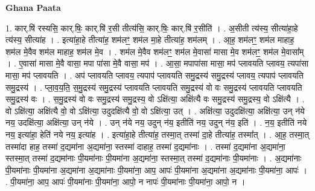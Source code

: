 \documentclass[17pt]{extarticle}
\begin{document}
\textbf{Ghana Paata } \newline

1. कार्.षि॑ रस्यसि॒ कार्.षिः॒ कार्.षि॑ र॒सी तीत्य॑सि॒ कार्.षिः॒ कार्.षि॑ र॒सीति॑ । . अ॒सीती त्य॑स्य॒ सीत्या॑हा॒हे त्य॑स्य॒ सीत्या॑ह । . इत्या॑हा॒हे तीत्या॑ह॒ शम॑लꣳ॒॒ शम॑ल मा॒हे तीत्या॑ह॒ शम॑लम् । . आ॒ह॒ शम॑लꣳ॒॒ शम॑ल माहाह॒ शम॑ल मे॒वैव शम॑ल माहाह॒ शम॑ल मे॒व । . शम॑ल मे॒वैव शम॑लꣳ॒॒ शम॑ल मे॒वासा॑ मासा मे॒व शम॑लꣳ॒॒ शम॑ल मे॒वासा᳚म् । . ए॒वासा॑ मासा मे॒वै वासा॒ मपा पा॑सा मे॒वै वासा॒ मप॑ । . आ॒सा॒ मपापा॑सा मासा॒ मप॑ प्लावयति प्लावय॒ त्यपा॑सा मासा॒ मप॑ प्लावयति । . अप॑ प्लावयति प्लावय॒ त्यपाप॑ प्लावयति समु॒द्रस्य॑ समु॒द्रस्य॑ प्लावय॒ त्यपाप॑ प्लावयति समु॒द्रस्य॑ । . प्ला॒व॒य॒ति॒ स॒मु॒द्रस्य॑ समु॒द्रस्य॑ प्लावयति प्लावयति समु॒द्रस्य॑ वो वः समु॒द्रस्य॑ प्लावयति प्लावयति समु॒द्रस्य॑ वः । . स॒मु॒द्रस्य॑ वो वः समु॒द्रस्य॑ समु॒द्रस्य॒ वो ऽक्षि॑त्या॒ अक्षि॑त्यै वः समु॒द्रस्य॑ समु॒द्रस्य॒ वो ऽक्षि॑त्यै । . वो ऽक्षि॑त्या॒ अक्षि॑त्यै वो॒ वो ऽक्षि॑त्या॒ उदुदक्षि॑त्यै वो॒ वो ऽक्षि॑त्या॒ उत् । . अक्षि॑त्या॒ उदुदक्षि॑त्या॒ अक्षि॑त्या॒ उन् न॑ये नय॒ उदक्षि॑त्या॒ अक्षि॑त्या॒ उन् न॑ये । . उन् न॑ये नय॒ उदुन् न॑य॒ इतीति॑ नय॒ उदुन् न॑य॒ इति॑ । . न॒य॒ इतीति॑ नये नय॒ इत्या॑हा॒ हेति॑ नये नय॒ इत्या॑ह । . इत्या॑हा॒हे तीत्या॑ह॒ तस्मा॒त् तस्मा॑ दा॒हे तीत्या॑ह॒ तस्मा᳚त् । . आ॒ह॒ तस्मा॒त् तस्मा॑दा हाह॒ तस्मा॑ द॒द्यमा॑ना अ॒द्यमा॑ना॒ स्तस्मा॑ दाहाह॒ तस्मा॑ द॒द्यमा॑नाः । . तस्मा॑ द॒द्यमा॑ना अ॒द्यमा॑ना॒ स्तस्मा॒त् तस्मा॑ द॒द्यमा॑नाः पी॒यमा॑नाः पी॒यमा॑ना अ॒द्यमा॑ना॒ स्तस्मा॒त् तस्मा॑ द॒द्यमा॑नाः पी॒यमा॑नाः । . अ॒द्यमा॑नाः पी॒यमा॑नाः पी॒यमा॑ना अ॒द्यमा॑ना अ॒द्यमा॑नाः पी॒यमा॑ना॒ आप॒ आपः॑ पी॒यमा॑ना अ॒द्यमा॑ना अ॒द्यमा॑नाः पी॒यमा॑ना॒ आपः॑ । . पी॒यमा॑ना॒ आप॒ आपः॑ पी॒यमा॑नाः पी॒यमा॑ना॒ आपो॒ न नापः॑ पी॒यमा॑नाः पी॒यमा॑ना॒ आपो॒ न । \newline
\end{document}
